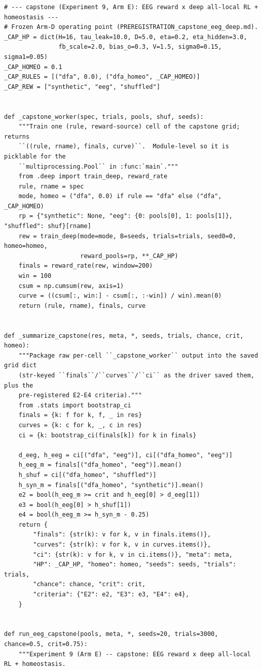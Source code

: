 \begin{lstlisting}[caption={mrl\_trace/biosignal.py},label={lst:siox-src-biosignal}]
# --- capstone (Experiment 9, Arm E): EEG reward x deep all-local RL + homeostasis ---
# Frozen Arm-D operating point (PREREGISTRATION_capstone_eeg_deep.md).
_CAP_HP = dict(H=16, tau_leak=10.0, D=5.0, eta=0.2, eta_hidden=3.0,
               fb_scale=2.0, bias_o=0.3, V=1.5, sigma0=0.15, sigma1=0.05)
_CAP_HOMEO = 0.1
_CAP_RULES = [("dfa", 0.0), ("dfa_homeo", _CAP_HOMEO)]
_CAP_REW = ["synthetic", "eeg", "shuffled"]


def _capstone_worker(spec, trials, pools, shuf, seeds):
    """Train one (rule, reward-source) cell of the capstone grid; returns
    ``((rule, rname), finals, curve)``.  Module-level so it is picklable for the
    ``multiprocessing.Pool`` in :func:`main`."""
    from .deep import train_deep, reward_rate
    rule, rname = spec
    mode, homeo = ("dfa", 0.0) if rule == "dfa" else ("dfa", _CAP_HOMEO)
    rp = {"synthetic": None, "eeg": {0: pools[0], 1: pools[1]}, "shuffled": shuf}[rname]
    rew = train_deep(mode=mode, B=seeds, trials=trials, seed0=0, homeo=homeo,
                     reward_pools=rp, **_CAP_HP)
    finals = reward_rate(rew, window=200)
    win = 100
    csum = np.cumsum(rew, axis=1)
    curve = ((csum[:, win:] - csum[:, :-win]) / win).mean(0)
    return (rule, rname), finals, curve


def _summarize_capstone(res, meta, *, seeds, trials, chance, crit, homeo):
    """Package raw per-cell ``_capstone_worker`` output into the saved grid dict
    (str-keyed ``finals``/``curves``/``ci`` as the driver saved them, plus the
    pre-registered E2-E4 criteria)."""
    from .stats import bootstrap_ci
    finals = {k: f for k, f, _ in res}
    curves = {k: c for k, _, c in res}
    ci = {k: bootstrap_ci(finals[k]) for k in finals}

    d_eeg, h_eeg = ci[("dfa", "eeg")], ci[("dfa_homeo", "eeg")]
    h_eeg_m = finals[("dfa_homeo", "eeg")].mean()
    h_shuf = ci[("dfa_homeo", "shuffled")]
    h_syn_m = finals[("dfa_homeo", "synthetic")].mean()
    e2 = bool(h_eeg_m >= crit and h_eeg[0] > d_eeg[1])
    e3 = bool(h_eeg[0] > h_shuf[1])
    e4 = bool(h_eeg_m >= h_syn_m - 0.25)
    return {
        "finals": {str(k): v for k, v in finals.items()},
        "curves": {str(k): v for k, v in curves.items()},
        "ci": {str(k): v for k, v in ci.items()}, "meta": meta,
        "HP": _CAP_HP, "homeo": homeo, "seeds": seeds, "trials": trials,
        "chance": chance, "crit": crit,
        "criteria": {"E2": e2, "E3": e3, "E4": e4},
    }


def run_eeg_capstone(pools, meta, *, seeds=20, trials=3000, chance=0.5, crit=0.75):
    """Experiment 9 (Arm E) -- capstone: EEG reward x deep all-local RL + homeostasis.


\end{lstlisting}
